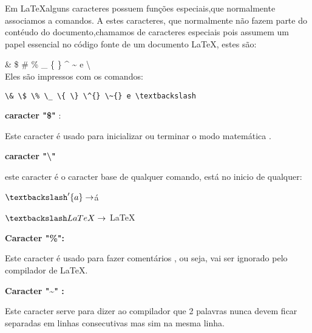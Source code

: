 Em \LaTeX alguns caracteres possuem funções especiais,que normalmente associamos a comandos.
A estes caracteres, que normalmente não fazem parte do contéudo do documento,chamamos de caracteres especiais pois assumem um papel essencial no código fonte de um documento \LaTeX , estes são:

\& \$ \# \% \_ \{ \} \^{} \~{} e \textbackslash\\



Eles são impressos com os comandos:

\begin{verbatim}
\& \$ \% \_ \{ \} \^{} \~{} e \textbackslash
\end{verbatim}

\textbf{caracter "\$"} :

Este caracter é usado para inicializar ou terminar o modo matemática .


\textbf{caracter "\textbackslash "}

este caracter é o caracter base de qualquer comando, está no inicio de qualquer:


$\textbackslash '\{a\} \rightarrow $\'{a}

$\textbackslash LaTeX \rightarrow $ \LaTeX


\textbf{Caracter "\%":}

Este caracter é usado para fazer comentários , ou seja, vai ser ignorado pelo compilador de \LaTeX . 


\textbf{Caracter "\textasciitilde" :}

Este caracter serve para dizer ao compilador que 2 palavras nunca devem ficar separadas em linhas consecutivas mas sim na mesma linha.